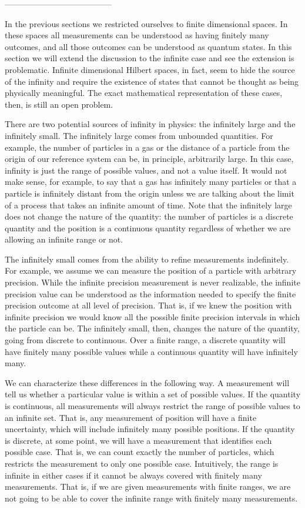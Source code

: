 ---------------------------------------

In the previous sections we restricted ourselves to finite dimensional spaces. In these spaces all measurements can be understood as having finitely many outcomes, and all those outcomes can be understood as quantum states. In this section we will extend the discussion to the infinite case and see the extension is problematic. Infinite dimensional Hilbert spaces, in fact, seem to hide the source of the infinity and require the existence of states that cannot be thought as being physically meaningful. The exact mathematical representation of these cases, then, is still an open problem.

There are two potential sources of infinity in physics: the infinitely large and the infinitely small. The infinitely large comes from unbounded quantities. For example, the number of particles in a gas or the distance of a particle from the origin of our reference system can be, in principle, arbitrarily large. In this case, infinity is just the range of possible values, and not a value itself. It would not make sense, for example, to say that a gas has infinitely many particles or that a particle is infinitely distant from the origin unless we are talking about the limit of a process that takes an infinite amount of time. Note that the infinitely large does not change the nature of the quantity: the number of particles is a discrete quantity and the position is a continuous quantity regardless of whether we are allowing an infinite range or not.

The infinitely small comes from the ability to refine measurements indefinitely. For example, we assume we can measure the position of a particle with arbitrary precision. While the infinite precision measurement is never realizable, the infinite precision value can be understood as the information needed to specify the finite precision outcome at all level of precision. That is, if we knew the position with infinite precision we would know all the possible finite precision intervals in which the particle can be. The infinitely small, then, changes the nature of the quantity, going from discrete to continuous. Over a finite range, a discrete quantity will have finitely many possible values while a continuous quantity will have infinitely many.

We can characterize these differences in the following way. A measurement will tell us whether a particular value is within a set of possible values. If the quantity is continuous, all measurements will always restrict the range of possible values to an infinite set. That is, any measurement of position will have a finite uncertainty, which will include infinitely many possible positions. If the quantity is discrete, at some point, we will have a measurement that identifies each possible case. That is, we can count exactly the number of particles, which restricts the measurement to only one possible case. Intuitively, the range is infinite in either cases if it cannot be always covered with finitely many measurements. That is, if we are given measurements with finite ranges, we are not going to be able to cover the infinite range with finitely many measurements.

